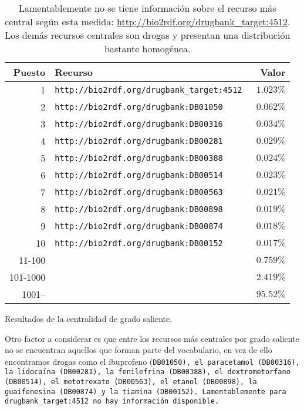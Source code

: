 \begin{table}[ht]
  \centering
  \begin{tabular}{|r|l|r|}\hline
    \bf{Puesto} & \bf{Recurso} & \bf{Valor} \\\hline
     1 & \tt{http://bio2rdf.org/drugbank\_target:4512} & $1.023\%$ \\\hline
     2 & \tt{http://bio2rdf.org/drugbank:DB01050}      & $0.062\%$ \\\hline
     3 & \tt{http://bio2rdf.org/drugbank:DB00316}      & $0.034\%$ \\\hline
     4 & \tt{http://bio2rdf.org/drugbank:DB00281}      & $0.029\%$ \\\hline
     5 & \tt{http://bio2rdf.org/drugbank:DB00388}      & $0.024\%$ \\\hline
     6 & \tt{http://bio2rdf.org/drugbank:DB00514}      & $0.023\%$ \\\hline
     7 & \tt{http://bio2rdf.org/drugbank:DB00563}      & $0.021\%$ \\\hline
     8 & \tt{http://bio2rdf.org/drugbank:DB00898}      & $0.019\%$ \\\hline
     9 & \tt{http://bio2rdf.org/drugbank:DB00874}      & $0.018\%$ \\\hline
    10 & \tt{http://bio2rdf.org/drugbank:DB00152}      & $0.017\%$ \\\hline
    11-100 		& & $0.759\%$ \\\hline
    101-1000  & & $2.419\%$ \\\hline
    1001--    & & $95.52\%$ \\\hline
  \end{tabular}
  \caption{Resultados de la centralidad de grado saliente.}\label{tab:odcres}
  \vspace{-.2cm}
  \caption*{\small
    Lamentablemente no se tiene información sobre el recurso más central según
    esta medida:
    \url{http://bio2rdf.org/drugbank\_target:4512}. Los demás recursos centrales
    son drogas y presentan una distribución bastante homogénea. 
  }
\end{table}

Otro factor a considerar es que entre los recursos más centrales por grado
saliente no se encuentran aquellos que forman parte del vocabulario, en vez de
ello encontramos drogas como el ibuprofeno (\tt{DB01050}), el paracetamol
(\tt{DB00316}), la lidocaína (\tt{DB00281}), la fenilefrina (\tt{DB00388}),
el dextrometorfano (\tt{DB00514}), el metotrexato (\tt{DB00563}), el etanol
(\tt{DB00898}), la guaifenesina (\tt{DB00874}) y la tiamina (\tt{DB00152}).
Lamentablemente para \tt{drugbank\_target:4512} no hay información disponible.

